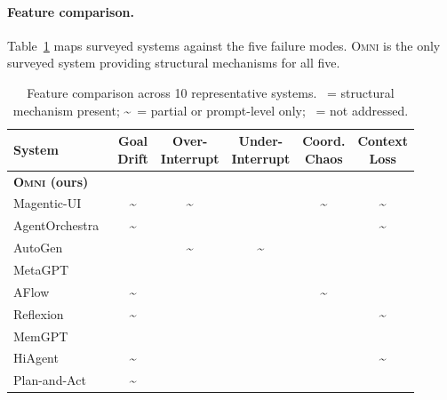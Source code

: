 \documentclass[11pt,a4paper]{article}
\newcommand{\cmark}{\textcolor{checkgreen}{\textbf{\checkmark}}}
\newcommand{\xmark}{\textcolor{crossred}{\textbf{\texttimes}}}
\newcommand{\pmark}{\textcolor{partialyellow}{\textbf{\textasciitilde}}}
\newcommand{\omni}{\textsc{Omni}}
\begin{document}
\paragraph{Feature comparison.} Table~\ref{tab:comparison} maps surveyed systems against the five failure modes. \omni{} is the only surveyed system providing structural mechanisms for all five.

\begin{table}[h]
\centering
\caption{Feature comparison across 10 representative systems. \cmark~= structural mechanism present; \pmark~= partial or prompt-level only; \xmark~= not addressed.}
\label{tab:comparison}
\small
\begin{tabular}{lccccc}
\toprule
\textbf{System} & \makecell{\textbf{Goal}\\\textbf{Drift}} & \makecell{\textbf{Over-}\\\textbf{Interrupt}} & \makecell{\textbf{Under-}\\\textbf{Interrupt}} & \makecell{\textbf{Coord.}\\\textbf{Chaos}} & \makecell{\textbf{Context}\\\textbf{Loss}} \\
\midrule
\textbf{\omni{} (ours)} & \cmark & \cmark & \cmark & \cmark & \cmark \\
Magentic-UI~\cite{microsoft2025magenticui} & \pmark & \pmark & \cmark & \pmark & \pmark \\
AgentOrchestra~\cite{agentorchestra2025} & \pmark & \xmark & \xmark & \xmark & \pmark \\
AutoGen~\cite{wu2024autogen} & \xmark & \pmark & \pmark & \xmark & \xmark \\
MetaGPT~\cite{hong2024metagpt} & \xmark & \xmark & \xmark & \xmark & \xmark \\
AFlow~\cite{zhao2025aflow} & \pmark & \xmark & \xmark & \pmark & \xmark \\
Reflexion~\cite{shinn2023reflexion} & \pmark & \xmark & \xmark & \xmark & \pmark \\
MemGPT~\cite{packer2023memgpt} & \xmark & \xmark & \xmark & \xmark & \cmark \\
HiAgent~\cite{hiagent2024} & \pmark & \xmark & \xmark & \xmark & \pmark \\
Plan-and-Act~\cite{planandact2025} & \pmark & \xmark & \xmark & \xmark & \xmark \\
\bottomrule
\end{tabular}
\end{table}

\end{document}
